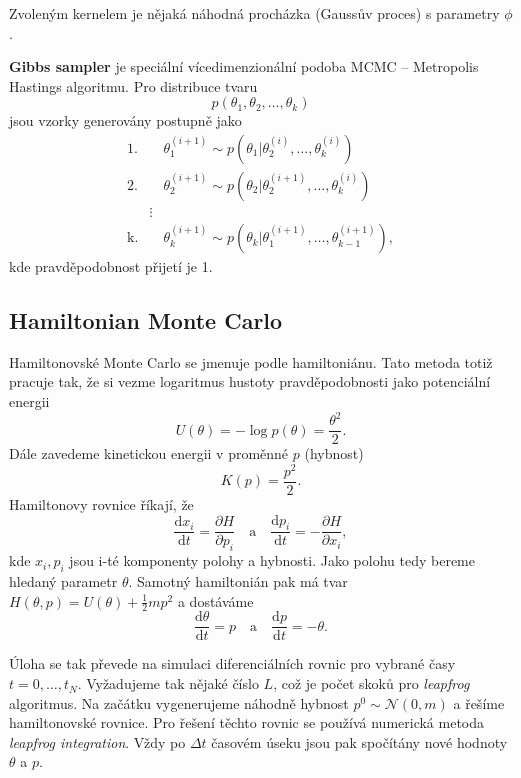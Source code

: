 \documentclass[11pt,oneside,american,czech]{article}
\newcommand{\N}{\mathcal{N}}
\newcommand{\der}{\mathrm{d}}
\newcommand{\half}{\frac{1}{2}}
\begin{document}
Zvoleným kernelem je nějaká náhodná procházka (Gaussův proces) s parametry $\phi$.

\textbf{Gibbs sampler} je speciální vícedimenzionální podoba MCMC -- Metropolis Hastings algoritmu. Pro distribuce tvaru
\begin{equation*}
p(\theta_1, \theta_2, \dots, \theta_k)
\end{equation*}
jsou vzorky generovány postupně jako
\begin{align*}
\text{1.} & \quad \theta_1^{(i+1)} \sim p(\theta_1|\theta_2^{(i)}, \dots, \theta_k^{(i)}) \\
\text{2.} & \quad \theta_2^{(i+1)} \sim p(\theta_2|\theta_2^{(i+1)}, \dots, \theta_k^{(i)}) \\
& \vdots \\
\text{k.} & \quad \theta_k^{(i+1)} \sim p(\theta_k|\theta_1^{(i+1)}, \dots, \theta_{k-1}^{(i+1)}),
\end{align*}
kde pravděpodobnost přijetí je 1.


\subsection{Hamiltonian Monte Carlo}

Hamiltonovské Monte Carlo se jmenuje podle hamiltoniánu. Tato metoda totiž pracuje tak, že si vezme logaritmus hustoty pravděpodobnosti jako potenciální energii
\begin{equation*}
	U(\theta) = - \log p(\theta) = \frac{\theta^2}{2}.
\end{equation*}
Dále zavedeme kinetickou energii v proměnné $p$ (hybnost)
\begin{equation*}
	K(p) = \frac{p^2}{2}.
\end{equation*}
Hamiltonovy rovnice říkají, že
\begin{equation*}
	\frac{\der x_i}{\der t} = \frac{\partial H}{\partial p_i} \quad \text{a} \quad \frac{\der p_i}{\der t} = - \frac{\partial H}{\partial x_i},
\end{equation*}
kde $x_i, p_i$ jsou i-té komponenty polohy a hybnosti. Jako polohu tedy bereme hledaný parametr $\theta$. Samotný hamiltonián pak má tvar $H(\theta, p) = U(\theta) + \half mp^2$ a dostáváme
\begin{equation*}
	\frac{\der \theta}{\der t} = p \quad \text{a} \quad \frac{\der p}{\der t} = -\theta.
\end{equation*}

Úloha se tak převede na simulaci diferenciálních rovnic pro vybrané časy $t = 0, \dots, t_N$. Vyžadujeme tak nějaké číslo $L$, což je počet skoků pro \textit{leapfrog} algoritmus. Na začátku vygenerujeme náhodně hybnost $p^0 \sim \N(0,m)$ a řešíme hamiltonovské rovnice. Pro řešení těchto rovnic se používá numerická metoda \textit{leapfrog integration}. Vždy po $\Delta t$ časovém úseku jsou pak spočítány nové hodnoty $\theta$ a $p$.
\end{document}
